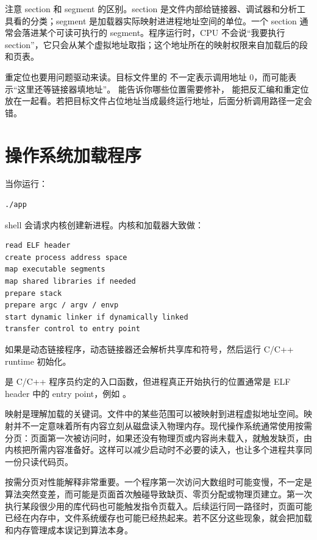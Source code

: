 注意 section 和 segment 的区别。section 是文件内部给链接器、调试器和分析工具看的分类；segment 是加载器实际映射进进程地址空间的单位。一个  section 通常会落进某个可读可执行的  segment。程序运行时，CPU 不会说“我要执行  section”，它只会从某个虚拟地址取指；这个地址所在的映射权限来自加载后的段和页表。

重定位也要用问题驱动来读。目标文件里的  不一定表示调用地址 0，而可能表示“这里还等链接器填地址”。 能告诉你哪些位置需要修补， 能把反汇编和重定位放在一起看。若把目标文件占位地址当成最终运行地址，后面分析调用路径一定会错。

\section{操作系统加载程序}

当你运行：

\begin{lstlisting}[language=bash]
./app
\end{lstlisting}

shell 会请求内核创建新进程。内核和加载器大致做：

\begin{center}
\begin{minipage}{0.82\linewidth}
\begin{verbatim}
read ELF header
create process address space
map executable segments
map shared libraries if needed
prepare stack
prepare argc / argv / envp
start dynamic linker if dynamically linked
transfer control to entry point
\end{verbatim}
\end{minipage}
\end{center}

如果是动态链接程序，动态链接器还会解析共享库和符号，然后运行 C/C++ runtime 初始化。

\begin{keyidea}
 是 C/C++ 程序员约定的入口函数，但进程真正开始执行的位置通常是 ELF header 中的 entry point，例如 。
\end{keyidea}

映射是理解加载的关键词。文件中的某些范围可以被映射到进程虚拟地址空间。映射并不一定意味着所有内容立刻从磁盘读入物理内存。现代操作系统通常使用按需分页：页面第一次被访问时，如果还没有物理页或内容尚未载入，就触发缺页，由内核把所需内容准备好。这样可以减少启动时不必要的读入，也让多个进程共享同一份只读代码页。

按需分页对性能解释非常重要。一个程序第一次访问大数组时可能变慢，不一定是算法突然变差，而可能是页面首次触碰导致缺页、零页分配或物理页建立。第一次执行某段很少用的库代码也可能触发指令页载入。后续运行同一路径时，页面可能已经在内存中，文件系统缓存也可能已经热起来。若不区分这些现象，就会把加载和内存管理成本误记到算法本身。

